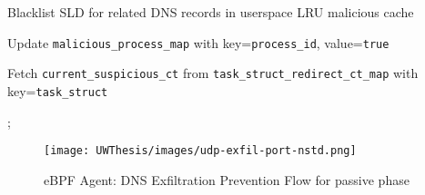 \documentclass [11pt, proquest] {uwthesis}[2020/02/24]
\begin{document}
\begin{algorithm}[H]
{    Blacklist SLD for related DNS records in userspace LRU malicious cache\;

    Update \texttt{malicious\_process\_map} with key=\texttt{process\_id}, value=\texttt{true}\;

    Fetch \texttt{current\_suspicious\_ct} from \texttt{task\_struct\_redirect\_ct\_map} with key=\texttt{task\_struct}\;

    \Return;
}
\end{algorithm}


\begin{figure}[htbp]
\centering
\texttt{[image: UWThesis/images/udp-exfil-port-nstd.png]}
\caption{eBPF Agent: DNS Exfiltration Prevention Flow for passive phase}
\label{sec:dp-passive-phase}
\end{figure}

\newpage
\end{document}
